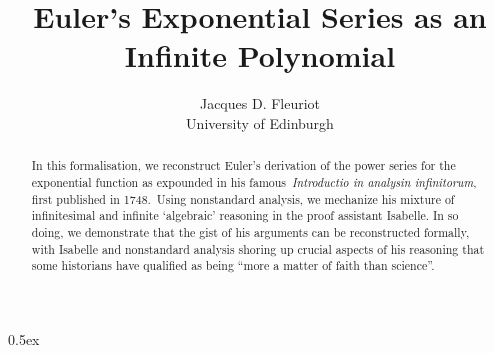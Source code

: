 \documentclass[11pt,a4paper]{article}
\begin{document}
\title{Euler's Exponential Series as an Infinite Polynomial}
\author{Jacques D. Fleuriot\\
        University of Edinburgh}
\maketitle

\begin{abstract}
In this formalisation, we reconstruct Euler's derivation of the power series for the exponential function as expounded in his famous~\emph{Introductio in analysin infinitorum}, first published in 1748.~Using nonstandard analysis, we mechanize his mixture of infinitesimal and infinite `algebraic' reasoning in the proof assistant Isabelle. In so doing, we demonstrate that the gist of his arguments can be reconstructed formally, with Isabelle and nonstandard analysis shoring up crucial aspects of his reasoning that some historians have qualified as being ``more a matter of faith than science''.
\end{abstract}

\tableofcontents
\newpage

\parindent 0pt\parskip 0.5ex



%
%
\end{document}
